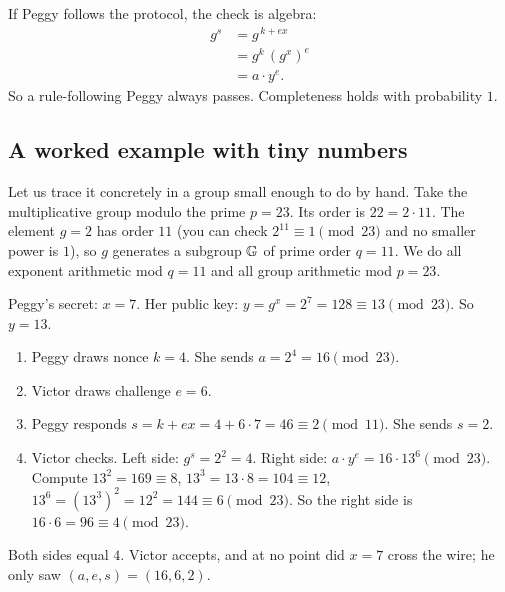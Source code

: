 If Peggy follows the protocol, the check is algebra:
\begin{align*}
  g^{s} &= g^{\,k + e x} \\
        &= g^{k}\,(g^{x})^{e} \\
        &= a\cdot y^{e}.
\end{align*}
So a rule-following Peggy always passes. Completeness holds with probability $1$.

\subsection*{A worked example with tiny numbers}
\label{ch31:schnorr-example}

Let us trace it concretely in a group small enough to do by hand. Take the
multiplicative group modulo the prime $p = 23$. Its order is $22 = 2 \cdot 11$.
The element $g = 2$ has order $11$ (you can check $2^{11} \equiv 1 \pmod{23}$ and
no smaller power is $1$), so $g$ generates a subgroup $\mathbb{G}$ of prime order
$q = 11$. We do all exponent arithmetic mod $q = 11$ and all group arithmetic
mod $p = 23$.

Peggy's secret: $x = 7$. Her public key: $y = g^{x} = 2^{7} = 128 \equiv 13
\pmod{23}$. So $y = 13$.

\begin{enumerate}
  \item Peggy draws nonce $k = 4$. She sends $a = 2^{4} = 16 \pmod{23}$.
  \item Victor draws challenge $e = 6$.
  \item Peggy responds $s = k + e x = 4 + 6\cdot 7 = 46 \equiv 2 \pmod{11}$.
        She sends $s = 2$.
  \item Victor checks. Left side: $g^{s} = 2^{2} = 4$. Right side:
        $a\cdot y^{e} = 16 \cdot 13^{6} \pmod{23}$. Compute $13^{2}=169\equiv 8$,
        $13^{3}=13\cdot 8 = 104 \equiv 12$, $13^{6}=(13^{3})^{2}=12^{2}=144
        \equiv 6 \pmod{23}$. So the right side is $16\cdot 6 = 96 \equiv 4
        \pmod{23}$.
\end{enumerate}
Both sides equal $4$. Victor accepts, and at no point did $x = 7$ cross the
wire; he only saw $(a,e,s) = (16, 6, 2)$.


